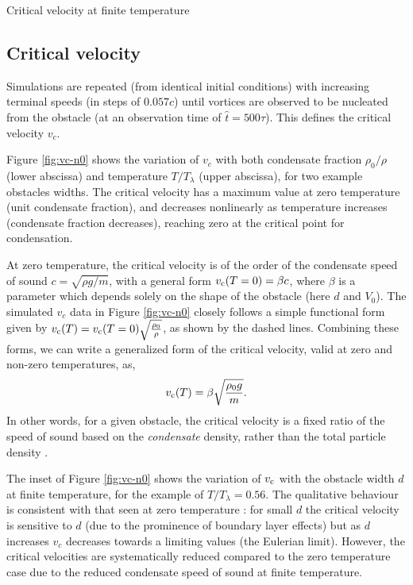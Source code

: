\begin{chapter}{\label{cha:nonequib}Critical velocity at finite temperature}
  
\subsection{Critical velocity \label{sec:vc}}
Simulations are repeated (from identical initial conditions) with increasing terminal speeds (in steps of $0.057c$) until vortices are observed to be nucleated from the obstacle (at an observation time of $\hat{t}=500\tau$). This defines the critical velocity $v_c$.  



Figure \ref{fig:vc-n0} shows the variation of $v_c$ with both condensate fraction $\rho_0/\rho$ (lower abscissa) and temperature $T/T_\lambda$ (upper abscissa), for two example obstacles widths.  The critical velocity has a maximum value at zero temperature (unit condensate fraction), and decreases nonlinearly as temperature increases (condensate fraction decreases), reaching zero at the critical point for condensation.  

At zero temperature, the critical velocity is of the order of the condensate speed of sound $c=\sqrt{\rho g/m}$, with a general form $v_{\rm c}(T=0)=\beta c$,
where $\beta$ is a parameter which depends solely on the shape of the obstacle (here $d$ and $V_0$).  The simulated $v_c$ data in Figure \ref{fig:vc-n0} closely follows a simple functional form given by $v_{\rm c}(T) = v_{\rm c}(T=0) \sqrt{\frac{\rho_0}{\rho}}$, as shown by the dashed lines.  Combining these forms, we can write a generalized form of the critical velocity, valid at zero and non-zero temperatures, as,
\begin{equation}
v_{\rm c}(T)=\beta \sqrt{\frac{\rho_0 g}{m}}.
\label{eqn:finite_vc}
\end{equation}
In other words, for a given obstacle, the critical velocity is a fixed ratio of the speed of sound based on the {\it condensate} density, rather than the total particle density \cite{leadbeater_2003}.  

The inset of Figure \ref{fig:vc-n0} shows the variation of $v_{\rm c}$ with the obstacle width $d$ at finite temperature, for the example of $T/T_\lambda =0.56$.   The qualitative behaviour is consistent with that seen at zero temperature \cite{huepe00,rica2001,stagg_parker_14}: for small $d$ the critical velocity is sensitive to $d$ (due to the prominence of boundary layer effects) but as $d$ increases $v_c$ decreases towards a limiting values (the Eulerian limit).  However, the critical velocities are systematically reduced compared to the zero temperature case due to the reduced condensate speed of sound at finite temperature. 




\end{chapter}
